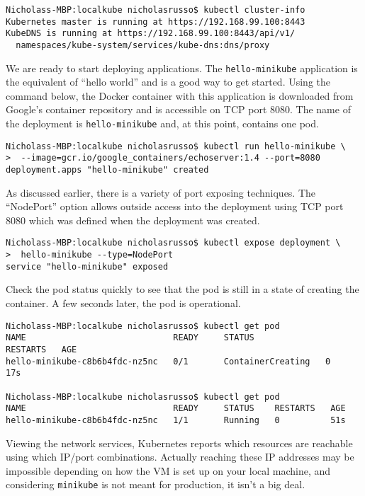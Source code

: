 \begin{verbatim}
Nicholass-MBP:localkube nicholasrusso$ kubectl cluster-info
Kubernetes master is running at https://192.168.99.100:8443
KubeDNS is running at https://192.168.99.100:8443/api/v1/
  namespaces/kube-system/services/kube-dns:dns/proxy
\end{verbatim}

We are ready to start deploying applications. The \verb|hello-minikube| application
is the equivalent of ``hello world'' and is a good way to get started. Using the
command below, the Docker container with this application is downloaded from
Google's container repository and is accessible on TCP port 8080. The name of
the deployment is \verb|hello-minikube| and, at this point, contains one pod.

\begin{verbatim}
Nicholass-MBP:localkube nicholasrusso$ kubectl run hello-minikube \
>  --image=gcr.io/google_containers/echoserver:1.4 --port=8080
deployment.apps "hello-minikube" created
\end{verbatim}

As discussed earlier, there is a variety of port exposing techniques. The
``NodePort'' option allows outside access into the deployment using TCP port
8080 which was defined when the deployment was created.

\begin{verbatim}
Nicholass-MBP:localkube nicholasrusso$ kubectl expose deployment \
>  hello-minikube --type=NodePort
service "hello-minikube" exposed
\end{verbatim}

Check the pod status quickly to see that the pod is still in a state of creating the
container. A few seconds later, the pod is operational.

\begin{verbatim}
Nicholass-MBP:localkube nicholasrusso$ kubectl get pod
NAME                             READY     STATUS              RESTARTS   AGE
hello-minikube-c8b6b4fdc-nz5nc   0/1       ContainerCreating   0          17s

Nicholass-MBP:localkube nicholasrusso$ kubectl get pod
NAME                             READY     STATUS    RESTARTS   AGE
hello-minikube-c8b6b4fdc-nz5nc   1/1       Running   0          51s
\end{verbatim}

Viewing the network services, Kubernetes reports which resources are reachable
using which IP/port combinations. Actually reaching these IP addresses may be
impossible depending on how the VM is set up on your local machine, and
considering \verb|minikube| is not meant for production, it isn't a big deal.

